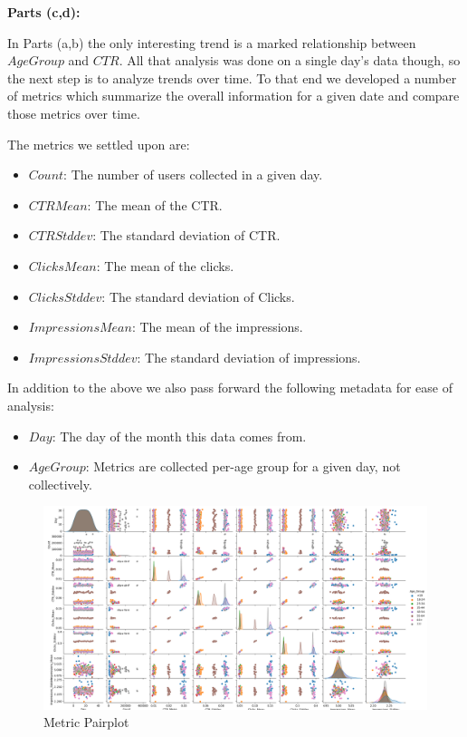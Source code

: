 \documentclass[12pt]{article}
\begin{document}
\begin{enumerate}[leftmargin=\labelsep]
  \textbf{Parts (c,d):}
  
  In Parts (a,b) the only interesting trend is a marked relationship between $Age Group$ and $CTR$. All that analysis
  was done on a single day's data though, so the next step is to analyze trends over time. To that end we developed a number of metrics which
  summarize the overall information for a given date and compare those metrics over time.
  
  The metrics we settled upon are:
  \begin{itemize}
    \item $Count$: The number of users collected in a given day.
    \item $CTR Mean$: The mean of the CTR.
    \item $CTR Stddev$: The standard deviation of CTR.
    \item $Clicks Mean$: The mean of the clicks.
    \item $Clicks Stddev$: The standard deviation of Clicks.
    \item $Impressions Mean$: The mean of the impressions.
    \item $Impressions Stddev$: The standard deviation of impressions.
  \end{itemize}

  In addition to the above we also pass forward the following metadata for ease of analysis:

  \begin{itemize}
    \item $Day$: The day of the month this data comes from.
    \item $Age Group$: Metrics are collected per-age group for a given day, not collectively.
  \end{itemize}
  
  \begin{figure}[htb]
    \begin{center}
      \includegraphics[width=\textwidth]{media/p1_c_i.png}
    \end{center}
    \caption{Metric Pairplot}
    \label{fig:p1_c_i}
  \end{figure}
  

\end{enumerate}
\end{document}
